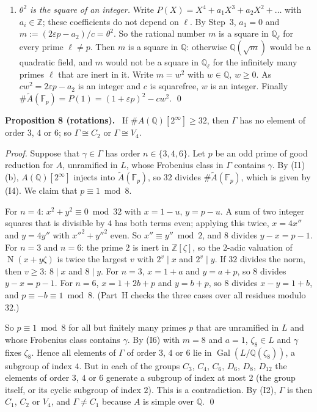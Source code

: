 \documentclass[11pt]{article}
\newenvironment{statement}[1]{\par\medskip\noindent\phantomsection\textbf{#1}\ }{\par\medskip}
\newcommand{\Q}{\mathbb Q}
\newcommand{\Z}{\mathbb Z}
\newcommand{\F}{\mathbb F}
\DeclareMathOperator{\Gal}{Gal}
\DeclareMathOperator{\Norm}{N}
\begin{document}
\begin{enumerate}
\item \emph{\(\theta^2\) is the square of an integer.} Write \(P(X)=X^4+a_1X^3+a_2X^2+\dots\) with \(a_i\in\Z\); these
coefficients do not depend on \(\ell\). By Step~3, \(a_1=0\) and \(m:=(2\varepsilon p-a_2)/c=\theta^2\). So the rational number
\(m\) is a square in \(\Q_\ell\) for every prime \(\ell\neq p\). Then \(m\) is a square in \(\Q\): otherwise
\(\Q(\sqrt m)\) would be a quadratic field, and \(m\) would not be a square in \(\Q_\ell\) for the infinitely many
primes \(\ell\) that are inert in it. Write \(m=w^2\) with \(w\in\Q\), \(w\ge0\). As \(cw^2=2\varepsilon p-a_2\) is an integer
and \(c\) is squarefree, \(w\) is an integer. Finally \(\#\widetilde A(\F_p)=P(1)=(1+\varepsilon p)^2-cw^2\). \qed
\end{enumerate}

\begin{statement}{Proposition 8 (rotations).}\label{prop-rot}
If \(\#A(\Q)[2^\infty]\ge32\), then \(\Gamma\) has no element of order \(3\), \(4\) or \(6\); so
\(\Gamma\cong C_2\) or \(\Gamma\cong V_4\).
\end{statement}

\emph{Proof.} Suppose that \(\gamma\in\Gamma\) has order \(n\in\{3,4,6\}\). Let \(p\) be an odd prime of good
reduction for \(A\), unramified in \(L\), whose Frobenius class in \(\Gamma\) contains \(\gamma\). By (I1)(b),
\(A(\Q)[2^\infty]\) injects into \(\widetilde A(\F_p)\), so \(32\) divides \(\#\widetilde A(\F_p)\), which is given
by (I4). We claim that \(p\equiv1\bmod8\).

For \(n=4\): \(x^2+y^2\equiv0\bmod32\) with \(x=1-u\), \(y=p-u\). A sum of two integer squares that is divisible
by \(4\) has both terms even; applying this twice, \(x=4x''\) and \(y=4y''\) with \(x''^2+y''^2\) even. So
\(x''\equiv y''\bmod2\), and \(8\) divides \(y-x=p-1\).
For \(n=3\) and \(n=6\): the prime \(2\) is inert in \(\Z[\zeta]\), so the \(2\)-adic valuation of
\(\Norm(x+y\zeta)\) is twice the largest \(v\) with \(2^v\mid x\) and \(2^v\mid y\). If \(32\) divides the norm,
then \(v\ge3\): \(8\mid x\) and \(8\mid y\). For \(n=3\), \(x=1+a\) and \(y=a+p\), so \(8\) divides \(y-x=p-1\).
For \(n=6\), \(x=1+2b+p\) and \(y=b+p\), so \(8\) divides \(x-y=1+b\), and \(p\equiv-b\equiv1\bmod8\).
(Part~H checks the three cases over all residues modulo \(32\).)

So \(p\equiv1\bmod8\) for all but finitely many primes \(p\) that are unramified in \(L\) and whose Frobenius class
contains \(\gamma\). By (I6) with \(m=8\) and \(a=1\), \(\zeta_8\in L\) and \(\gamma\) fixes \(\zeta_8\). Hence
all elements of \(\Gamma\) of order \(3\), \(4\) or \(6\) lie in \(\Gal(L/\Q(\zeta_8))\), a subgroup of index
\(4\). But in each of the groups \(C_3\), \(C_4\), \(C_6\), \(D_6\), \(D_8\), \(D_{12}\) the elements of order
\(3\), \(4\) or \(6\) generate a subgroup of index at most \(2\) (the group itself, or its cyclic subgroup of
index \(2\)). This is a contradiction. By (I2), \(\Gamma\) is then \(C_1\), \(C_2\) or \(V_4\), and
\(\Gamma\neq C_1\) because \(A\) is simple over \(\Q\). \qed
\end{document}
